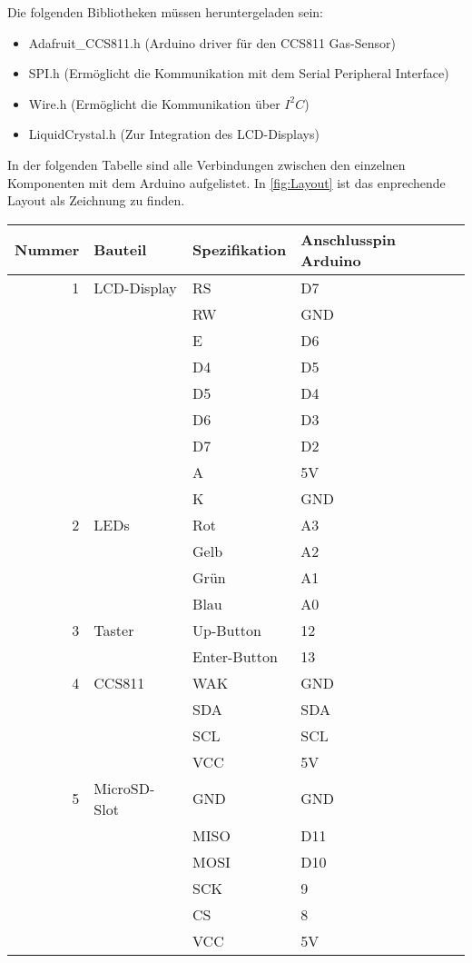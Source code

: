 \label{Installationsanleitung}

Die folgenden Bibliotheken müssen heruntergeladen sein:

\begin{itemize}
	\item Adafruit\_CCS811.h (Arduino driver für den CCS811 Gas-Sensor)
	\item SPI.h (Ermöglicht die Kommunikation mit dem Serial Peripheral Interface)
	\item Wire.h (Ermöglicht die Kommunikation über $I^2C$)
	\item LiquidCrystal.h (Zur Integration des \ac{LCD}-Displays)
\end{itemize}

In der folgenden Tabelle sind alle Verbindungen zwischen den einzelnen Komponenten mit dem Arduino aufgelistet. In \ref{fig:Layout} ist das enprechende Layout als Zeichnung zu finden.

\begin{table}[!hbt]
	
	\centering
	
	\begin{tabular}{|r| p{4.5cm} | p{4.3cm} |p{4.3cm}|}
		
		\hline
		Nummer & Bauteil & Spezifikation & Anschlusspin Arduino \\
		\hline
		1 & \ac{LCD}-Display & RS & D7 \\
		 & & RW & GND \\
		 & & E & D6 \\
		 & & D4 & D5 \\
		 & & D5 & D4 \\
		 & & D6 & D3 \\
		 & & D7 & D2 \\
		 & & A & 5V \\
		 & & K & GND \\
		\hline
		2 & LEDs & Rot & A3 \\
		 & & Gelb & A2\\
		 & & Grün & A1\\
		 & & Blau & A0\\
		\hline
		3 & Taster & Up-Button & 12 \\
		 & & Enter-Button & 13 \\
		\hline	
		4 & CCS811 & WAK & GND \\
		 & & SDA & SDA \\
		 & & SCL & SCL \\
		 & & VCC & 5V \\
		\hline
		5 & MicroSD-Slot & GND & GND \\
		 & & MISO & D11 \\
		 & & MOSI & D10 \\
		 & & SCK & 9 \\
		 & & CS & 8 \\
		 & & VCC & 5V \\
		\hline
	\end{tabular}
	
	\label{tab:PINs}
	
\end{table}